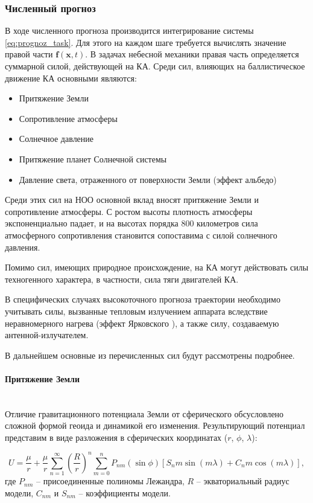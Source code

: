 \subsubsection{Численный прогноз}

В ходе численного прогноза производится интегрирование системы \eqref{eq:prognoz_task}.
Для этого на каждом шаге требуется вычислять значение правой части $\mathbf{f}(\mathbf{x}, t)$. 
В задачах небесной механики правая часть определяется суммарной силой, действующей на КА.
Среди сил, влияющих на баллистическое движение КА основными являются:
\begin{itemize}
    \item Притяжение Земли
    \item Сопротивление атмосферы
    \item Солнечное давление
    \item Притяжение планет Солнечной системы
    \item Давление света, отраженного от поверхности Земли (эффект альбедо)
\end{itemize}

Среди этих сил на НОО основной вклад вносят притяжение Земли и сопротивление атмосферы.
С ростом высоты плотность атмосферы экспоненциально падает, и на высотах порядка 800 километров
сила атмосферного сопротивления становится сопоставима с силой солнечного давления.

Помимо сил, имеющих природное происхождение, на КА могут действовать силы техногенного характера, 
в частности, сила тяги двигателей КА.

В специфических случаях высокоточного прогноза траектории необходимо учитывать
силы, вызванные тепловым излучением аппарата вследствие неравномерного нагрева (эффект Ярковского \cite{farinella1996}), 
а также силу, создаваемую антенной-излучателем.

В дальнейшем основные из перечисленных сил будут рассмотрены подробнее.

\paragraph{Притяжение Земли} \mbox{} \\

Отличие гравитационного потенциала Земли от сферического обсусловлено 
сложной формой геоида и динамикой его изменения. Результирующий потенциал представим в виде разложения
в сферических координатах ($r$, $\phi$, $\lambda$):

\begin{equation*}
    U = \frac{\mu}{r} + 
    \frac{\mu}{r} \sum_{n=1}^{\infty} \left(\frac{R}{r}\right)^n 
    \sum_{m=0}^{n} P_{nm}(\sin\phi) \left[ S_nm \sin(m \lambda) + C_nm \cos(m \lambda) \right],
\end{equation*}
где $P_{nm}$ -- присоединенные полиномы Лежандра, $R$ -- экваториальный радиус модели, 
$C_{nm}$ и $S_{nm}$ -- коэффициенты модели.

